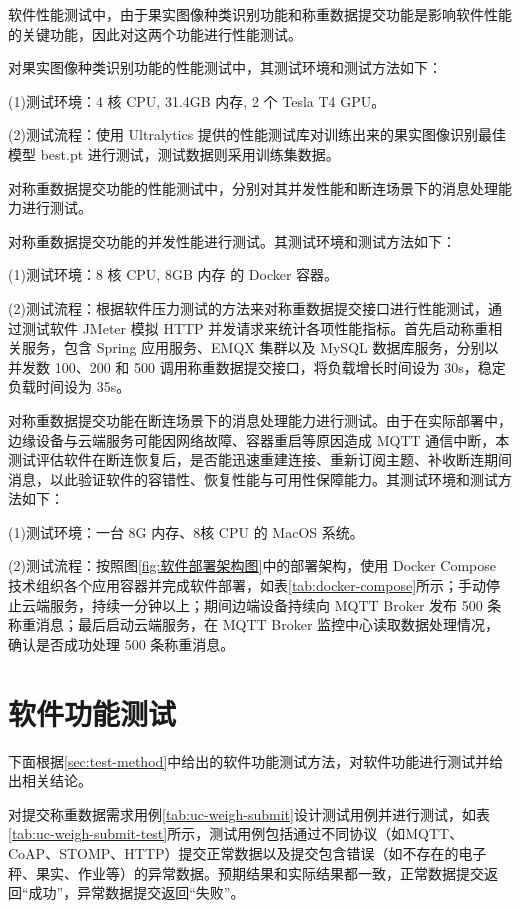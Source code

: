 软件性能测试中，由于果实图像种类识别功能和称重数据提交功能是影响软件性能的关键功能，因此对这两个功能进行性能测试。

对果实图像种类识别功能的性能测试中，其测试环境和测试方法如下：

(1)测试环境：4 核 CPU, 31.4GB 内存, 2 个 Tesla T4 GPU。

(2)测试流程：使用 Ultralytics 提供的性能测试库对训练出来的果实图像识别最佳模型 best.pt 进行测试，测试数据则采用训练集数据。

对称重数据提交功能的性能测试中，分别对其并发性能和断连场景下的消息处理能力进行测试。

对称重数据提交功能的并发性能进行测试。其测试环境和测试方法如下：

(1)测试环境：8 核 CPU, 8GB 内存 的 Docker 容器。

(2)测试流程：根据软件压力测试的方法\cite{Zhu2017}来对称重数据提交接口进行性能测试，通过测试软件 JMeter 模拟 HTTP 并发请求来统计各项性能指标。首先启动称重相关服务，包含 Spring 应用服务、EMQX 集群以及 MySQL 数据库服务，分别以并发数 100、200 和 500 调用称重数据提交接口，将负载增长时间设为 30s，稳定负载时间设为 35s。

对称重数据提交功能在断连场景下的消息处理能力进行测试。由于在实际部署中，边缘设备与云端服务可能因网络故障、容器重启等原因造成 MQTT 通信中断，本测试评估软件在断连恢复后，是否能迅速重建连接、重新订阅主题、补收断连期间消息，以此验证软件的容错性、恢复性能与可用性保障能力。其测试环境和测试方法如下：

(1)测试环境：一台 8G 内存、8核 CPU 的 MacOS 系统。

(2)测试流程：按照图\ref{fig:软件部署架构图}中的部署架构，使用 Docker Compose 技术组织各个应用容器并完成软件部署，如表\ref{tab:docker-compose}所示；手动停止云端服务，持续一分钟以上；期间边端设备持续向 MQTT Broker 发布 500 条称重消息；最后启动云端服务，在 MQTT Broker 监控中心读取数据处理情况，确认是否成功处理 500 条称重消息。

\section{软件功能测试}\label{sec:test-func}

下面根据\ref{sec:test-method}中给出的软件功能测试方法，对软件功能进行测试并给出相关结论。

对提交称重数据需求用例\ref{tab:uc-weigh-submit}设计测试用例并进行测试，如表\ref{tab:uc-weigh-submit-test}所示，测试用例包括通过不同协议（如MQTT、CoAP、STOMP、HTTP）提交正常数据以及提交包含错误（如不存在的电子秤、果实、作业等）的异常数据。预期结果和实际结果都一致，正常数据提交返回“成功”，异常数据提交返回“失败”。

